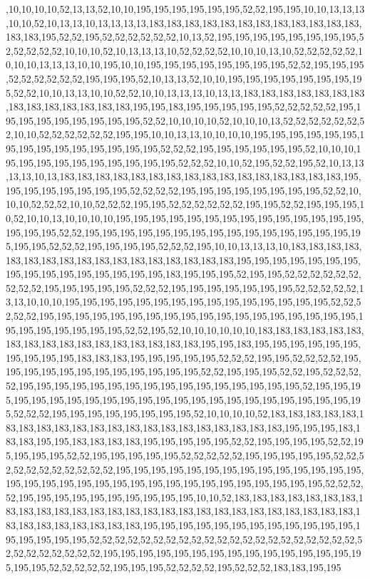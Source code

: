 ,10,10,10,10,52,13,13,52,10,10,195,195,195,195,195,195,52,52,195,195,10,10,13,13,13,10,10,52,10,13,13,10,13,13,13,13,183,183,183,183,183,183,183,183,183,183,183,183,183,183,195,52,52,195,52,52,52,52,52,52,10,13,52,195,195,195,195,195,195,195,195,52,52,52,52,52,10,10,10,52,10,13,13,13,10,52,52,52,52,10,10,10,13,10,52,52,52,52,52,10,10,10,13,13,13,10,10,195,10,10,195,195,195,195,195,195,195,195,52,52,195,195,195,52,52,52,52,52,52,195,195,195,52,10,13,13,52,10,10,195,195,195,195,195,195,195,195,52,52,10,10,13,13,10,10,52,52,10,10,13,13,13,10,13,13,183,183,183,183,183,183,183,183,183,183,183,183,183,183,195,195,183,195,195,195,195,195,52,52,52,52,52,195,195,195,195,195,195,195,195,195,52,52,10,10,10,10,52,10,10,10,13,52,52,52,52,52,52,52,10,10,52,52,52,52,52,52,195,195,10,10,13,13,10,10,10,10,195,195,195,195,195,195,195,195,195,195,195,195,195,195,195,52,52,52,195,195,195,195,195,195,52,10,10,10,195,195,195,195,195,195,195,195,195,195,52,52,52,10,10,52,195,52,52,195,52,10,13,13,13,13,10,13,183,183,183,183,183,183,183,183,183,183,183,183,183,183,183,183,195,195,195,195,195,195,195,195,52,52,52,52,195,195,195,195,195,195,195,195,52,52,10,10,10,52,52,52,10,10,52,52,52,195,195,52,52,52,52,52,52,195,195,52,52,195,195,195,10,52,10,10,13,10,10,10,10,195,195,195,195,195,195,195,195,195,195,195,195,195,195,195,195,195,52,52,195,195,195,195,195,195,195,195,195,195,195,195,195,195,195,195,195,195,52,52,52,195,195,195,195,52,52,52,195,10,10,13,13,13,10,183,183,183,183,183,183,183,183,183,183,183,183,183,183,183,183,183,195,195,195,195,195,195,195,195,195,195,195,195,195,195,195,195,183,195,195,195,52,195,195,52,52,52,52,52,52,52,52,52,195,195,195,195,195,52,52,52,195,195,195,195,195,195,195,52,52,52,52,52,13,13,10,10,10,195,195,195,195,195,195,195,195,195,195,195,195,195,195,195,52,52,52,52,52,195,195,195,195,195,195,195,195,195,195,195,195,195,195,195,195,195,195,195,195,195,195,195,195,195,52,52,195,52,10,10,10,10,10,10,183,183,183,183,183,183,183,183,183,183,183,183,183,183,183,183,183,195,195,183,195,195,195,195,195,195,195,195,195,195,183,183,183,195,195,195,195,195,52,52,52,195,195,52,52,52,52,195,195,195,195,195,195,195,195,195,195,195,195,52,52,195,195,195,52,52,195,52,52,52,52,195,195,195,195,195,195,195,195,195,195,195,195,195,195,195,195,52,195,195,195,195,195,195,195,195,195,195,195,195,195,195,195,195,195,195,195,195,195,195,195,52,52,52,195,195,195,195,195,195,195,195,52,10,10,10,10,52,183,183,183,183,183,183,183,183,183,183,183,183,183,183,183,183,183,183,183,183,183,195,195,195,183,183,183,195,195,183,183,183,183,195,195,195,195,195,52,52,195,195,195,195,52,52,195,195,195,195,52,52,195,195,195,195,195,52,52,52,52,52,195,195,195,195,195,52,52,52,52,52,52,52,52,52,52,52,195,195,195,195,195,195,195,195,195,195,195,195,195,195,195,195,195,195,195,195,195,195,195,195,195,195,195,195,195,195,195,195,52,52,52,52,195,195,195,195,195,195,195,195,195,195,10,10,52,183,183,183,183,183,183,183,183,183,183,183,183,183,183,183,183,183,183,183,183,183,183,183,183,183,183,183,183,183,183,183,183,183,183,183,195,195,195,195,195,195,195,195,195,195,195,195,195,195,195,195,195,52,52,52,52,52,52,52,52,52,52,52,52,52,52,52,52,52,52,52,52,52,52,52,52,52,52,52,52,52,195,195,195,195,195,195,195,195,195,195,195,195,195,195,195,195,195,52,52,52,52,52,195,195,195,52,52,52,52,195,52,52,52,183,183,195,195